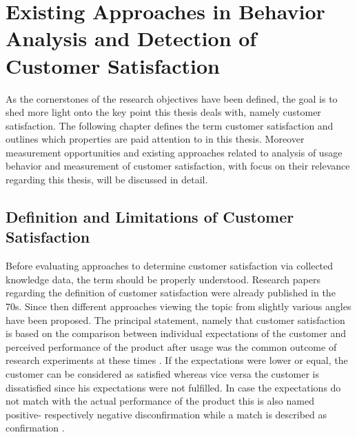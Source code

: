 \chapter{Existing Approaches in Behavior Analysis and Detection of Customer Satisfaction}
\label{ch:backgroundResearch}
As the cornerstones of the research objectives have been defined, the goal is to shed more light onto the key point this thesis deals with, namely customer satisfaction. The following chapter defines the term customer satisfaction and outlines which properties are paid attention to in this thesis. Moreover measurement opportunities and existing approaches related to analysis of usage behavior and measurement of customer satisfaction, with focus on their relevance regarding this thesis, will be discussed in detail.

\section{Definition and Limitations of Customer Satisfaction}
\label{sec:custSatisfactionDefinition}
Before evaluating approaches to determine customer satisfaction via collected knowledge data, the term should be properly understood. Research papers regarding the definition of customer satisfaction were already published in the 70s. Since then different approaches viewing the topic from slightly various angles have been proposed. The principal statement, namely that customer satisfaction is based on the comparison between individual expectations of the customer and perceived performance of the product after usage was the common outcome of research experiments at these times \cite{oliver1977effect} \cite{anderson1973consumer}. If the expectations were lower or equal, the customer can be considered as satisfied whereas vice versa the customer is dissatisfied since his expectations were not fulfilled. In case the expectations do not match with the actual performance of the product this is also named positive- respectively negative disconfirmation while a match is described as confirmation \cite{oliver1977effect} \cite{anderson1973consumer}.

